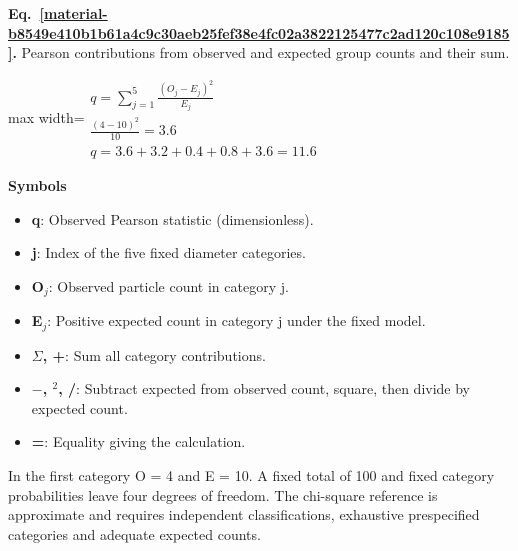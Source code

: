 \documentclass[11pt,a4paper]{article}
\begin{document}
\par\medskip
\noindent\begin{minipage}{\linewidth}
\label{material-b8549e410b1b61a4c9c30aeb25fef38e4fc02a3822125477c2ad120c108e9185}
\noindent\textbf{Eq.~\ref*{material-b8549e410b1b61a4c9c30aeb25fef38e4fc02a3822125477c2ad120c108e9185}.} Pearson contributions from observed and expected group counts and their sum.\par\nopagebreak
\begin{center}\begin{adjustbox}{max width=\linewidth}$\displaystyle \begin{gathered}q=\sum_{j=1}^{5}\frac{(O_j-E_j)^2}{E_j}\\\frac{(4-10)^2}{10}=3.6\\q=3.6+3.2+0.4+0.8+3.6=11.6\end{gathered}$\end{adjustbox}\end{center}

\par\noindent\textbf{Symbols}

\begin{itemize}\setlength{\itemsep}{1pt}\setlength{\parsep}{0pt}
\item \textbf{q}: Observed Pearson statistic (dimensionless).
\item \textbf{j}: Index of the five fixed diameter categories.
\item \textbf{O\ensuremath{{}_j}}: Observed particle count in category j.
\item \textbf{E\ensuremath{{}_j}}: Positive expected count in category j under the fixed model.
\item \textbf{\ensuremath{\Sigma}, +}: Sum all category contributions.
\item \textbf{\ensuremath{-}, \ensuremath{{}^2}, /}: Subtract expected from observed count, square, then divide by expected count.
\item \textbf{=}: Equality giving the calculation.
\end{itemize}

In the first category O = 4 and E = 10. A fixed total of 100 and fixed category probabilities leave four degrees of freedom. The chi-square reference is approximate and requires independent classifications, exhaustive prespecified categories and adequate expected counts.

\end{minipage}\par
\medskip
\end{document}
